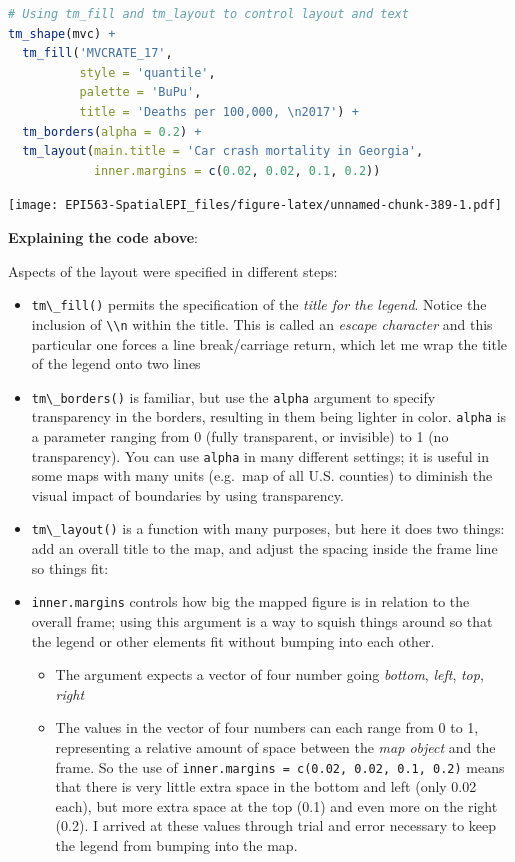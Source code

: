 \documentclass[
]{book}
\newcommand{\passthrough}[1]{#1}
\providecommand{\tightlist}{%
  \setlength{\itemsep}{0pt}\setlength{\parskip}{0pt}}
\begin{document}
\begin{lstlisting}[language=R]
# Using tm_fill and tm_layout to control layout and text
tm_shape(mvc) +
  tm_fill('MVCRATE_17',
          style = 'quantile',
          palette = 'BuPu',
          title = 'Deaths per 100,000, \n2017') +
  tm_borders(alpha = 0.2) +
  tm_layout(main.title = 'Car crash mortality in Georgia',
            inner.margins = c(0.02, 0.02, 0.1, 0.2))
\end{lstlisting}

\texttt{[image: EPI563-SpatialEPI\_files/figure-latex/unnamed-chunk-389-1.pdf]}

\textbf{Explaining the code above}:

Aspects of the layout were specified in different steps:

\begin{itemize}
\tightlist
\item
  \passthrough{\lstinline!tm\_fill()!} permits the specification of the \emph{title for the legend}. Notice the inclusion of \passthrough{\lstinline!\\n!} within the title. This is called an \emph{escape character} and this particular one forces a line break/carriage return, which let me wrap the title of the legend onto two lines
\item
  \passthrough{\lstinline!tm\_borders()!} is familiar, but use the \passthrough{\lstinline!alpha!} argument to specify transparency in the borders, resulting in them being lighter in color. \passthrough{\lstinline!alpha!} is a parameter ranging from 0 (fully transparent, or invisible) to 1 (no transparency). You can use \passthrough{\lstinline!alpha!} in many different settings; it is useful in some maps with many units (e.g.~map of all U.S. counties) to diminish the visual impact of boundaries by using transparency.
\item
  \passthrough{\lstinline!tm\_layout()!} is a function with many purposes, but here it does two things: add an overall title to the map, and adjust the spacing inside the frame line so things fit:
\item
  \passthrough{\lstinline!inner.margins!} controls how big the mapped figure is in relation to the overall frame; using this argument is a way to squish things around so that the legend or other elements fit without bumping into each other.

  \begin{itemize}
  \tightlist
  \item
    The argument expects a vector of four number going \emph{bottom}, \emph{left}, \emph{top}, \emph{right}
  \item
    The values in the vector of four numbers can each range from 0 to 1, representing a relative amount of space between the \emph{map object} and the frame. So the use of \passthrough{\lstinline!inner.margins = c(0.02, 0.02, 0.1, 0.2)!} means that there is very little extra space in the bottom and left (only 0.02 each), but more extra space at the top (0.1) and even more on the right (0.2). I arrived at these values through trial and error necessary to keep the legend from bumping into the map.
  \end{itemize}
\end{itemize}
\end{document}
